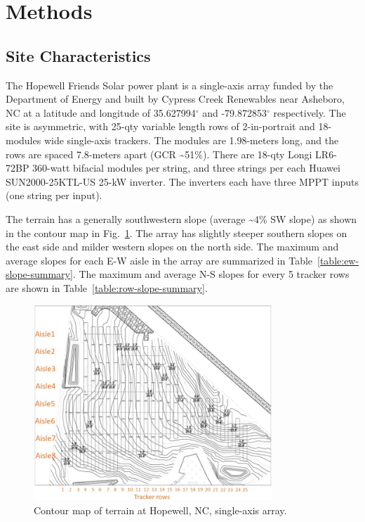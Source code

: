\documentclass[conference]{IEEEtran}
\begin{document}
\section{Methods}

\subsection{Site Characteristics}

The Hopewell Friends Solar power plant is a single-axis array funded by the Department of Energy and built by Cypress Creek Renewables \cite{CypressCreekRenewables2019} near Asheboro, NC at a latitude and longitude of 35.627994$^\circ$ and -79.872853$^\circ$ respectively. The site is asymmetric, with 25-qty variable length rows of 2-in-portrait and 18-modules wide single-axis trackers. The modules are 1.98-meters long, and the rows are spaced 7.8-meters apart (GCR \textasciitilde 51\%). There are 18-qty Longi LR6-72BP 360-watt bifacial modules per string, and three strings per each Huawei SUN2000-25KTL-US 25-kW inverter. The inverters each have three MPPT inputs (one string per input).

The terrain has a generally southwestern slope (average \textasciitilde 4\% SW slope) as shown in the contour map in Fig.~\ref{fig:hopewell_contour_map}. The array has slightly steeper southern slopes on the east side and milder western slopes on the north side. The maximum and average slopes for each E-W aisle in the array are summarized in Table~\ref{table:ew-slope-summary}. The maximum and average N-S slopes for every 5 tracker rows are shown in Table~\ref{table:row-slope-summary}.

\begin{figure}[htbp]
\centerline{\includegraphics[width=9cm]{Hopewell_Civil_Base.jpg}}
\caption{Contour map of terrain at Hopewell, NC, single-axis array.}
\label{fig:hopewell_contour_map}
\end{figure}
\end{document}
